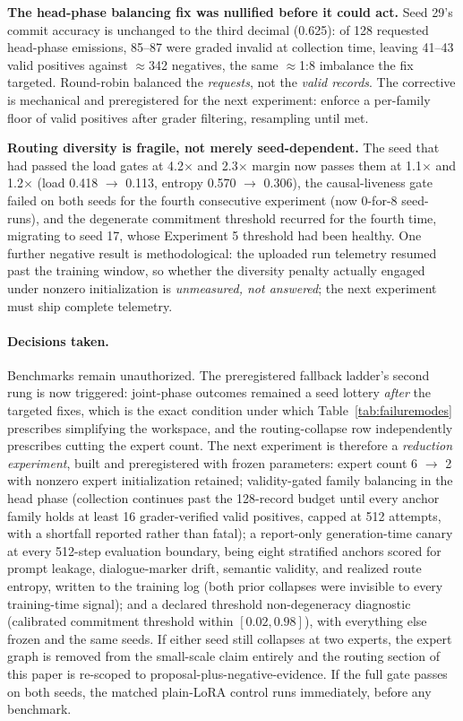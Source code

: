 \documentclass[10pt,a4paper]{article}
\begin{document}
\textbf{The head-phase balancing fix was nullified before it could act.}
Seed 29's commit accuracy is unchanged to the third decimal (0.625): of 128
requested head-phase emissions, 85--87 were graded invalid at collection
time, leaving 41--43 valid positives against $\approx$342 negatives, the
same $\approx$1:8 imbalance the fix targeted. Round-robin balanced the
\emph{requests}, not the \emph{valid records}. The corrective is mechanical
and preregistered for the next experiment: enforce a per-family floor of valid
positives after grader filtering, resampling until met.

\textbf{Routing diversity is fragile, not merely seed-dependent.} The seed
that had passed the load gates at 4.2$\times$ and 2.3$\times$ margin now
passes them at 1.1$\times$ and 1.2$\times$ (load 0.418 $\rightarrow$ 0.113,
entropy 0.570 $\rightarrow$ 0.306), the causal-liveness gate failed on both
seeds for the fourth consecutive experiment (now 0-for-8 seed-runs), and the
degenerate commitment threshold recurred for the fourth time, migrating to
seed 17, whose Experiment 5 threshold had been healthy. One further negative
result is methodological: the uploaded run telemetry resumed past the
training window, so whether the diversity penalty actually engaged under
nonzero initialization is \emph{unmeasured, not answered}; the next experiment
must ship complete telemetry.

\paragraph{Decisions taken.}
Benchmarks remain unauthorized. The preregistered fallback ladder's second
rung is now triggered: joint-phase outcomes remained a seed lottery
\emph{after} the targeted fixes, which is the exact condition under which
Table~\ref{tab:failuremodes} prescribes simplifying the workspace, and the
routing-collapse row independently prescribes cutting the expert count. The
next experiment is therefore a \emph{reduction experiment}, built and
preregistered with frozen parameters: expert count 6 $\rightarrow$ 2 with
nonzero expert initialization retained; validity-gated family balancing in
the head phase (collection continues past the 128-record budget until every
anchor family holds at least 16 grader-verified valid positives, capped at
512 attempts, with a shortfall reported rather than fatal); a report-only
generation-time canary at every 512-step evaluation boundary, being eight
stratified anchors scored for prompt leakage, dialogue-marker drift, semantic
validity, and realized route entropy, written to the training log (both prior
collapses were invisible to every training-time signal); and a declared
threshold non-degeneracy diagnostic (calibrated commitment threshold within
$[0.02, 0.98]$), with everything else frozen and the same seeds. If either
seed still collapses at two experts, the expert graph is removed from the
small-scale claim entirely and the routing section of this paper is re-scoped
to proposal-plus-negative-evidence. If the full gate passes on both seeds,
the matched plain-LoRA control runs immediately, before any benchmark.
\end{document}

